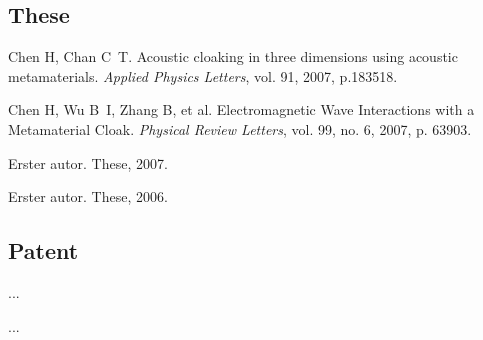 \begin{achievements}

  \subsection*{These}

  \begin{bibliolist}{00}
    \item Chen H, Chan C~T. Acoustic cloaking in three dimensions using acoustic metamaterials. \textit{Applied Physics Letters}, vol. 91, 2007, p.183518.
    \item Chen H, Wu B~I, Zhang B, et al. Electromagnetic Wave Interactions with a Metamaterial Cloak. \textit{Physical Review Letters}, vol. 99, no. 6, 2007, p. 63903.
  \end{bibliolist}

  \begin{bibliolist*}{00}
    \item Erster autor. These, 2007.
    \item Erster autor. These, 2006.
  \end{bibliolist*}

  \subsection*{Patent}

  \begin{bibliolist}{00}
    \item ...
  \end{bibliolist}

  \begin{bibliolist*}{00}
    \item ...
  \end{bibliolist*}

\end{achievements}

